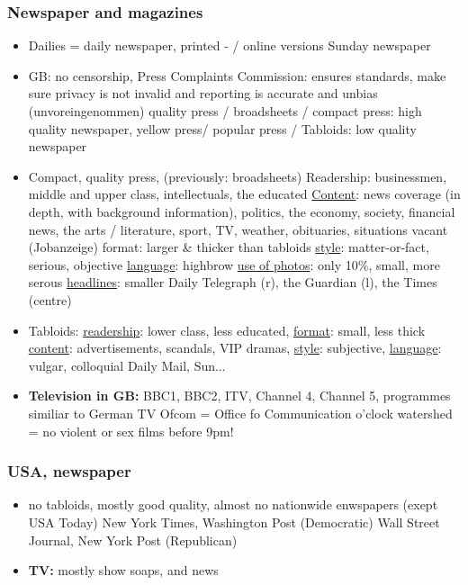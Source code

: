\documentclass[a5paper,12pt,twoside,titlepage]{scrartcl}
\begin{document}
\subsubsection{Newspaper and magazines}
	\begin{itemize}
	\item  
	\subitem Dailies = daily newspaper, printed - / online versions
	\subitem Sunday newspaper
	\item GB: 
	\subitem no censorship, 
	\subitem Press Complaints Commission: ensures standards, make sure privacy is not invalid and reporting is accurate and unbias (unvoreingenommen)
	\subitem quality press / broadsheets / compact press: high quality newspaper, 
	\subitem yellow press/ popular press / Tabloids: low quality newspaper
	\item Compact, quality press, (previously: broadsheets)
	\subitem Readership: businessmen, middle and upper class, intellectuals, the educated
	\subitem \underline{Content}: news coverage (in depth, with background information), politics, the economy, society, financial news, the arts / literature, sport, TV, weather, obituaries, situations vacant (Jobanzeige)
	\subitem format: larger \& thicker than tabloids 
	\subitem \underline{style}: matter-or-fact, serious, objective
	\subitem \underline{language}: highbrow
	\subitem \underline{ use of photos}: only 10\%, small, more serous
	\subitem \underline{headlines}: smaller
	\subitem Daily Telegraph (r), the Guardian (l), the Times (centre)
	\item Tabloids:
	\subitem \underline{readership}: lower class, less educated, 
	\subitem \underline{format}: small, less thick
	\subitem \underline{content}: advertisements, scandals, VIP dramas, 
	\subitem \underline{style}: subjective,
	\subitem \underline{language}: vulgar, colloquial
	\subitem Daily Mail, Sun...
	\item \textbf{Television in GB:}
	\subitem  BBC1, BBC2, ITV, Channel 4, Channel 5, programmes similiar to German TV
	 \subitem Ofcom = Office fo Communication
	  o'clock watershed = no violent or sex films before 9pm!
\end{itemize}
\subsubsection{USA, newspaper}
\begin{itemize}
	\item no tabloids, mostly good quality, almost no nationwide enwspapers (exept USA Today)
	\subitem New York Times, Washington Post (Democratic)
	\subitem Wall Street Journal, New York Post (Republican)
	\item \textbf{TV:} mostly show soaps, and news
	
\end{itemize}
\end{document}
